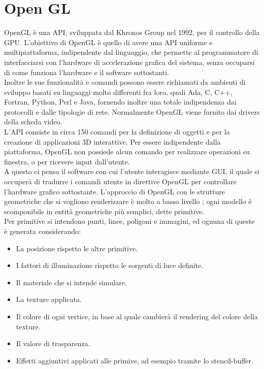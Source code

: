 \section{Open GL}
\label{sec:chapter_stato_arte_open_gl}

OpenGL è una API, sviluppata dal Khronos Group nel 1992, per il controllo della GPU. L’obiettivo di OpenGL è quello di avere una API uniforme e multipiattaforma, indipendente dal linguaggio, che permette al programmatore di interfacciarsi con l’hardware di accelerazione grafica del sistema, senza occuparsi di come funziona l’hardware e il software sottostanti. \cite{open11}
\\
Inoltre le sue funzionalità e comandi possono essere richiamati da ambienti di sviluppo basati su linguaggi molto differenti fra loro, quali Ada, C, C++, Fortran, Python, Perl e Java, fornendo inoltre una totale indipendenza dai protocolli e dalle tipologie di rete. 
Normalmente OpenGL viene fornito dai drivers della scheda video.
\\
L’API consiste in circa 150 comandi per la definizione di oggetti e per la creazione di applicazioni 3D interattive. Per essere indipendente dalla piattaforma, OpenGL non possiede alcun comando per realizzare operazioni su finestra, o per ricevere input dall’utente.
\\ 
A questo ci pensa il software con cui l’utente interagisce mediante GUI, il quale si occuperà di tradurre i comandi utente in direttive OpenGL per controllare l’hardware grafico sottostante. 
L’approccio di OpenGL con le strutture geometriche che si vogliono renderizzare è molto a basso livello \cite{open13} ; ogni modello è scomponibile in entità geometriche più semplici, dette primitive. 
\\
Per primitive si intendono punti, linee, poligoni e immagini, ed ognuna di queste è generata considerando:
\begin{itemize}
\item La posizione rispetto le altre primitive.
\item I fattori di illuminazione rispetto le sorgenti di luce definite.
\item Il materiale che si intende simulare.
\item La texture applicata.
\item Il colore di ogni vertice, in base al quale cambierà il rendering del colore della texture.
\item Il valore di trasparenza.
\item Effetti aggiuntivi applicati alle primive, ad esempio tramite lo stencil-buffer. 
\end{itemize}
